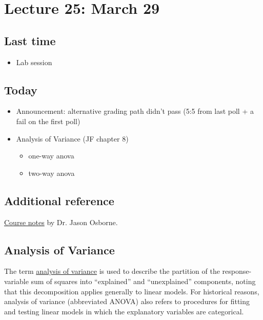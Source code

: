 \setcounter{section}{24}

\section{Lecture 25: March 29}


\subsection*{Last time}
\begin{itemize}
	\item Lab session
\end{itemize}


\subsection*{Today}
\begin{itemize}
	\item Announcement: alternative grading path didn't pass (5:5 from last poll + a fail on the first poll)
	\item Analysis of Variance (JF chapter 8)
	  \begin{itemize}
	  	\item one-way anova
	  	\item two-way anova
	  \end{itemize}
\end{itemize}

\subsection*{Additional reference}
\href{https://www4.stat.ncsu.edu/~osborne/st512r/handouts/allpackets.pdf}{Course notes} by Dr. Jason Osborne.

\subsection*{Analysis of Variance}

The term \underline{analysis of variance} is used to describe the partition of the response-variable sum of squares into ``explained'' and ``unexplained'' components, noting that this decomposition applies generally to linear models.
For historical reasons, analysis of variance (abbreviated ANOVA) also refers to procedures for fitting and testing linear models in which the explanatory variables are categorical.


